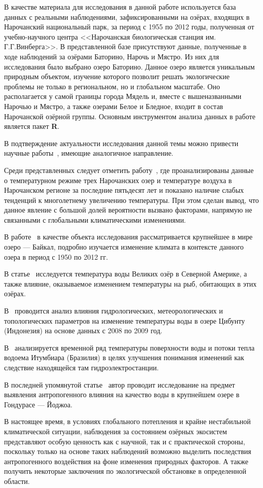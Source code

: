 В качестве материала для исследования в данной работе используется база данных с реальными наблюдениями, зафиксированными на озёрах, входящих в Нарочанский национальный парк, за период с 1955 по 2012 годы, полученная от учебно-научного центра <<Нарочанская биологическая станция им. Г.Г.Винберга>>. В представленной базе присутствуют данные, полученные в ходе наблюдений за озёрами Баторино, Нарочь и Мястро. Из них для исследования было выбрано озеро Баторино. Данное озеро является уникальным природным объектом, изучение которого позволит решать экологические проблемы не только в региональном, но и глобальном масштабе. Оно располагается у самой границы города Мядель и, вместе с вышеназванными Нарочью и Мястро, а также озерами Белое и Бледное, входит в состав Нарочанской озёрной группы. Основным инструментом анализа данных в работе является пакет \textbf{R}.

В подтверждение актуальности исследования данной темы можно привести научные работы~\cite{zhukova2014, Katz2011, OBrien2012a, Subehi2011, ALCANTARA2011, Chokshi2006}, имеющие аналогичное направление.

Среди представленных следует отметить работу~\cite{zhukova2014}, где проанализированы данные о температурном режиме трех Нарочанских озер и температуре воздуха в Нарочанском регионе за последние пятьдесят лет и показано наличие слабых тенденций к многолетнему увеличению температуры. При этом сделан вывод, что данное явление с большой долей вероятности вызвано факторами, напрямую не связанными с глобальными климатическими изменениями.

В работе~\cite{Katz2011} в качестве объекта исследования рассматривается крупнейшее в мире озеро --- Байкал, подробно изучается изменение климата в контексте данного озера в период с 1950 по 2012 гг.

В статье~\cite{OBrien2012a} исследуется температура воды Великих озёр в Северной Америке, а также влияние, оказываемое изменением температуры на рыб, обитающих в этих озёрах.

В~\cite{Subehi2011} проводится анализ влияния гидрологических, метеорологических и топологических параметров на изменение температуры воды в озере Цибунту (Индонезия) на основе данных с 2008 по 2009 год.

В~\cite{ALCANTARA2011} анализируется временной ряд температуры поверхности воды и потоки тепла водоема Итумбиара (Бразилия) в целях улучшения понимания изменений как следствие находящейся там гидроэлектростанции.

В последней упомянутой статье~\cite{Chokshi2006} автор проводит исследование на предмет выявления антропогенного влияния на качество воды в крупнейшем озере в Гондурасе --- Йоджоа.

В настоящее время, в условиях глобального потепления и крайне нестабильной климатической ситуации, наблюдения за состоянием озёрных экосистем представляют особую ценность как с научной, так и с практической стороны, поскольку только на основе таких наблюдений возможно выделить последствия антропогенного воздействия на фоне изменения природных факторов. А также получить некоторые заключения по экологической обстановке в определенной области.
